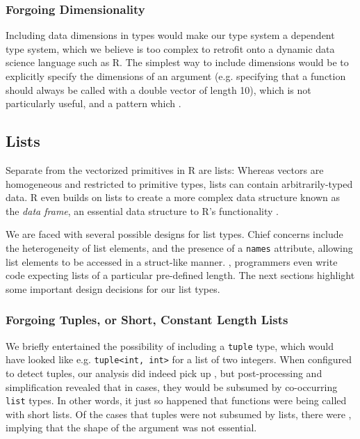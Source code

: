 \documentclass[acmsmall,review,anonymous]{acmart}\settopmatter{printfolios=true,printccs=false,printacmref=false}
\newcommand{\code}[1]{{\lstinline[style=Rin]!#1!}\xspace}
\begin{document}
%
%
\subsubsection{Forgoing Dimensionality} 

Including data dimensions in types would make our type system a dependent type system, which we believe is too complex to retrofit onto a dynamic data science language such as R.
The simplest way to include dimensions would be to explicitly specify the dimensions of an argument (e.g. specifying that a function should always be called with a double vector of length 10), which is not particularly useful, and a pattern which .



%
%
%
%
\subsection{Lists}

Separate from the vectorized primitives in R are lists:
Whereas vectors are homogeneous and restricted to primitive types, lists can contain arbitrarily-typed data.
R even builds on lists to create a more complex data structure known as the {\it data frame}, an essential data structure to R's functionality .

We are faced with several possible designs for list types.
Chief concerns include the heterogeneity of list elements, and the presence of a \code{names} attribute, allowing list elements to be accessed in a struct-like manner.
, programmers even write code expecting lists of a particular pre-defined length.
The next sections highlight some important design decisions for our list types.


%
%
\subsubsection{Forgoing Tuples, or Short, Constant Length Lists}

We briefly entertained the possibility of including a \code{tuple} type, which would have looked like e.g. \code{tuple<int, int>} for a list of two integers.
When configured to detect tuples, our analysis did indeed pick up , but post-processing and simplification revealed that in  cases, they would be subsumed by co-occurring \code{list} types.
In other words, it just so happened that functions were being called with short lists.
Of the cases that tuples were not subsumed by lists,  there were , implying that the shape of the argument was not essential.
\end{document}
